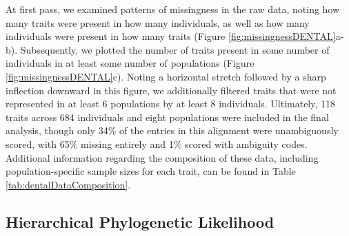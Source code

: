 At first pass, we examined patterns of missingness in the raw data, noting how many traits were present in how many individuals, as well as how many individuals were present in how many traits (Figure \ref{fig:missingnessDENTAL}a-b). Subsequently, we plotted the number of traits present in some number of individuals in at least some number of populations (Figure \ref{fig:missingnessDENTAL}c). Noting a horizontal stretch followed by a sharp inflection downward in this figure, we additionally filtered traits that were not represented in at least 6 populations by at least 8 individuals. Ultimately, 118 traits across 684 individuals and eight populations were included in the final analysis, though only 34\% of the entries in this alignment were unambiguously scored, with 65\% missing entirely and 1\% scored with ambiguity codes. Additional information regarding the composition of these data, including population-specific sample sizes for each trait, can be found in Table \ref{tab:dentalDataComposition}.

\subsection{Hierarchical Phylogenetic Likelihood}

